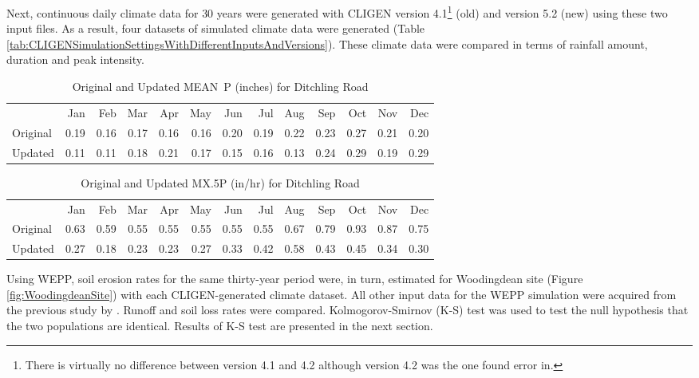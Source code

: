 Next, continuous daily climate data for 30 years were generated with CLIGEN
version 4.1\footnote{There is virtually no difference between version 4.1 and
4.2 although version 4.2 was the one \citet{yu2000-301} found error in.} (old)
and version 5.2 (new) using these two input files. As a result, four datasets of
simulated climate data were generated (Table
\ref{tab:CLIGENSimulationSettingsWithDifferentInputsAndVersions}). These climate
data were compared in terms of rainfall amount, duration and peak intensity.

\begin{table}[htbp]
  \centering
  \caption[Original and Updated MEAN~P for Ditchling Road]{Original and
Updated MEAN~P (inches) for Ditchling Road}
  \label{tab:UpdatedMEANPForDitchlingRoad}
    \footnotesize
    \begin{tabular}{lrrrrrrrrrrrr}
    \toprule
     & Jan & Feb & Mar & Apr & May & Jun & Jul & Aug & Sep & Oct &
Nov & Dec\\
    \cmidrule{2-13}
    Original & 0.19 & 0.16 & 0.17 & 0.16 & 0.16 & 0.20 & 0.19 & 0.22
& 0.23 & 0.27 & 0.21 & 0.20\\
    Updated & 0.11 & 0.11 & 0.18 & 0.21 & 0.17 & 0.15 & 0.16 & 0.13
& 0.24 & 0.29 & 0.19 & 0.29\\
    \bottomrule
    \end{tabular}
\end{table}

\begin{table}[htbp]
  \centering
  \caption[Original and Updated {MX.5P} for Ditchling Road]{Original and
Updated {MX.5P} (in/hr) for Ditchling Road}
  \label{tab:UpdatedMX5PForDitchlingRoad}
    \footnotesize
    \begin{tabular}{lrrrrrrrrrrrr}
    \toprule
     & Jan & Feb & Mar & Apr & May & Jun & Jul & Aug & Sep & Oct &
Nov & Dec\\
    \cmidrule{2-13}
    Original & 0.63 & 0.59 & 0.55 & 0.55 & 0.55 & 0.55 & 0.55 & 0.67
& 0.79 & 0.93 & 0.87 & 0.75\\
    Updated & 0.27 & 0.18 & 0.23 & 0.23 & 0.27 & 0.33 & 0.42 & 0.58
& 0.43 & 0.45 & 0.34 & 0.30\\
    \bottomrule
    \end{tabular}
\end{table}

Using WEPP, soil erosion rates for the same thirty-year period were, in turn,
estimated for Woodingdean site (Figure \ref{fig:WoodingdeanSite}) with each
CLIGEN-generated climate dataset. All other input data for the WEPP simulation
were acquired from the previous study by \citet{favis-mortlock1998-141}. Runoff
and soil loss rates were compared.
Kolmogorov-Smirnov (K-S) test was used to test the null hypothesis that the two
populations are identical. Results of K-S test are presented in the next
section.

